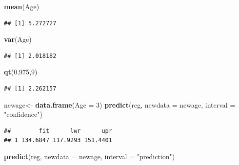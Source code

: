 \documentclass[
]{article}
\newenvironment{Shaded}{\begin{snugshade}}{\end{snugshade}}
\newcommand{\AttributeTok}[1]{\textcolor[rgb]{0.13,0.29,0.53}{#1}}
\newcommand{\DecValTok}[1]{\textcolor[rgb]{0.00,0.00,0.81}{#1}}
\newcommand{\FloatTok}[1]{\textcolor[rgb]{0.00,0.00,0.81}{#1}}
\newcommand{\FunctionTok}[1]{\textcolor[rgb]{0.13,0.29,0.53}{\textbf{#1}}}
\newcommand{\NormalTok}[1]{#1}
\newcommand{\OtherTok}[1]{\textcolor[rgb]{0.56,0.35,0.01}{#1}}
\newcommand{\StringTok}[1]{\textcolor[rgb]{0.31,0.60,0.02}{#1}}
\begin{document}
\begin{Shaded}
\begin{Highlighting}[]
\FunctionTok{mean}\NormalTok{(Age)}
\end{Highlighting}
\end{Shaded}

\begin{verbatim}
## [1] 5.272727
\end{verbatim}

\begin{Shaded}
\begin{Highlighting}[]
\FunctionTok{var}\NormalTok{(Age)}
\end{Highlighting}
\end{Shaded}

\begin{verbatim}
## [1] 2.018182
\end{verbatim}

\begin{Shaded}
\begin{Highlighting}[]
\FunctionTok{qt}\NormalTok{(}\FloatTok{0.975}\NormalTok{,}\DecValTok{9}\NormalTok{)}
\end{Highlighting}
\end{Shaded}

\begin{verbatim}
## [1] 2.262157
\end{verbatim}

\begin{Shaded}
\begin{Highlighting}[]
\NormalTok{newage}\OtherTok{\textless{}{-}} \FunctionTok{data.frame}\NormalTok{(}\AttributeTok{Age =} \DecValTok{3}\NormalTok{)}
\FunctionTok{predict}\NormalTok{(reg, }\AttributeTok{newdata =}\NormalTok{ newage, }\AttributeTok{interval =} \StringTok{"confidence"}\NormalTok{)}
\end{Highlighting}
\end{Shaded}

\begin{verbatim}
##        fit      lwr      upr
## 1 134.6847 117.9293 151.4401
\end{verbatim}

\begin{Shaded}
\begin{Highlighting}[]
\FunctionTok{predict}\NormalTok{(reg, }\AttributeTok{newdata =}\NormalTok{ newage, }\AttributeTok{interval =} \StringTok{"prediction"}\NormalTok{)}
\end{Highlighting}
\end{Shaded}
\end{document}
